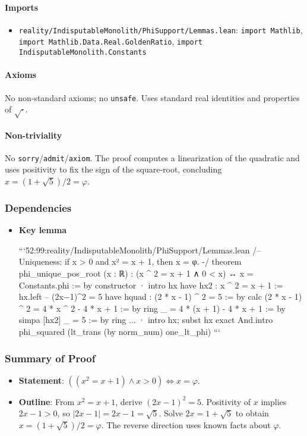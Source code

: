 \documentclass{article}
\newcommand{\FileRef}[1]{\texttt{#1}}
\begin{document}
\paragraph{Imports}
\begin{itemize}[leftmargin=*]
  \item \FileRef{reality/IndisputableMonolith/PhiSupport/Lemmas.lean}: \texttt{import Mathlib}, \texttt{import Mathlib.Data.Real.GoldenRatio}, \texttt{import IndisputableMonolith.Constants}
\end{itemize}

\paragraph{Axioms}
No non‑standard axioms; no \texttt{unsafe}. Uses standard real identities and properties of \(\sqrt{\cdot}\).

\paragraph{Non-triviality}
No \texttt{sorry}/\texttt{admit}/\texttt{axiom}. The proof computes a linearization of the quadratic and uses positivity to fix the sign of the square‑root, concluding \(x=(1+\sqrt{5})/2=\varphi\).

\subsubsection{Dependencies}
\begin{itemize}[leftmargin=*]
  \item \textbf{Key lemma}

```52:99:reality/IndisputableMonolith/PhiSupport/Lemmas.lean
/-- Uniqueness: if x > 0 and x² = x + 1, then x = φ. -/
 theorem phi_unique_pos_root (x : ℝ) : (x ^ 2 = x + 1 ∧ 0 < x) ↔ x = Constants.phi := by
  constructor
  · intro hx
    have hx2 : x ^ 2 = x + 1 := hx.left
    -- (2x−1)^2 = 5
    have hquad : (2 * x - 1) ^ 2 = 5 := by
      calc
        (2 * x - 1) ^ 2 = 4 * x ^ 2 - 4 * x + 1 := by ring
        _ = 4 * (x + 1) - 4 * x + 1 := by simpa [hx2]
        _ = 5 := by ring
    ...
  · intro hx; subst hx
    exact And.intro phi_squared (lt_trans (by norm_num) one_lt_phi)
```
\end{itemize}

\subsubsection{Summary of Proof}
\begin{itemize}[leftmargin=*]
  \item \textbf{Statement}: \(((x^2=x+1) \land x>0) \iff x=\varphi\).
  \item \textbf{Outline}: From \(x^2=x+1\), derive \((2x-1)^2=5\). Positivity of \(x\) implies \(2x-1>0\), so \(|2x-1|=2x-1=\sqrt{5}\). Solve \(2x=1+\sqrt{5}\) to obtain \(x=(1+\sqrt{5})/2=\varphi\). The reverse direction uses known facts about \(\varphi\).
\end{itemize}
\end{document}
